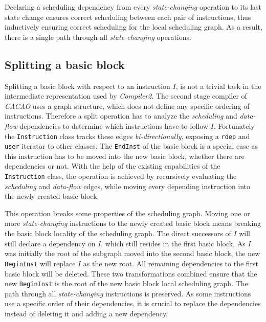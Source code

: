 \documentclass[draft, final]{vutinfth} %
\begin{document}
Declaring a scheduling dependency from every \emph{state-changing} operation to its last state change ensures correct scheduling between each pair of instructions, thus inductively ensuring correct scheduling for the local scheduling graph. As a result, there is a single path through all \emph{state-changing} operations.

\subsection{Splitting a basic block}

Splitting a basic block with respect to an instruction $I$, is not a trivial task in the intermediate representation used by \emph{Compiler2}. The second stage compiler of \emph{CACAO} uses a graph structure, which does not define any specific ordering of instructions. Therefore a split operation has to analyze the \emph{scheduling} and \emph{data-flow} dependencies to determine which instructions have to follow $I$. Fortunately the \texttt{Instruction} class tracks these edges \emph{bi-directionally}, exposing a \texttt{rdep} and \texttt{user} iterator to other classes. The \texttt{EndInst} of the basic block is a special case as this instruction has to  be moved into the new basic block, whether there are dependencies or not. With the help of the existing capabilities of the \texttt{Instruction} class, the operation is achieved by recursively evaluating the \emph{scheduling} and \emph{data-flow} edges, while moving every depending instruction into the newly created basic block.

This operation breaks some properties of the scheduling graph. Moving one or more \emph{state-changing} instructions to the newly created basic block means breaking the basic block locality of the scheduling graph. The direct successors of $I$ will still declare a dependency on $I$, which still resides in the first basic block. As $I$ was initially the root of the subgraph moved into the second basic block, the new \texttt{BeginInst} will replace $I$ as the new root. All remaining dependencies to the first basic block will be deleted. These two transformations combined ensure that the new \texttt{BeginInst} is the root of the new basic block local scheduling graph. The path through all \emph{state-changing} instructions is preserved. As some instructions use a specific order of their dependencies, it is crucial to replace the dependencies instead of deleting it and adding a new dependency.
\end{document}

